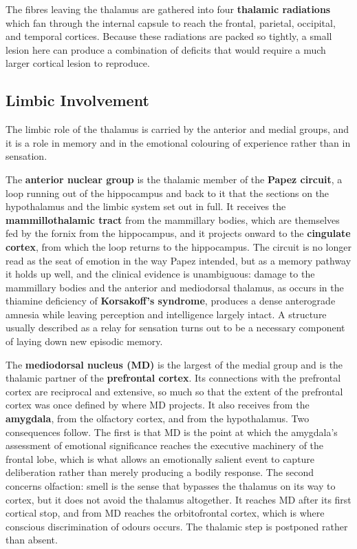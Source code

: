 \documentclass[11pt]{article}
\begin{document}
The fibres leaving the thalamus are gathered into four \textbf{thalamic radiations} which fan through the internal capsule to reach the frontal, parietal, occipital, and temporal cortices. Because these radiations are packed so tightly, a small lesion here can produce a combination of deficits that would require a much larger cortical lesion to reproduce.

\subsection{Limbic Involvement}

The limbic role of the thalamus is carried by the anterior and medial groups, and it is a role in memory and in the emotional colouring of experience rather than in sensation.

The \textbf{anterior nuclear group} is the thalamic member of the \textbf{Papez circuit}, a loop running out of the hippocampus and back to it that the sections on the hypothalamus and the limbic system set out in full. It receives the \textbf{mammillothalamic tract} from the mammillary bodies, which are themselves fed by the fornix from the hippocampus, and it projects onward to the \textbf{cingulate cortex}, from which the loop returns to the hippocampus. The circuit is no longer read as the seat of emotion in the way Papez intended, but as a memory pathway it holds up well, and the clinical evidence is unambiguous: damage to the mammillary bodies and the anterior and mediodorsal thalamus, as occurs in the thiamine deficiency of \textbf{Korsakoff's syndrome}, produces a dense anterograde amnesia while leaving perception and intelligence largely intact. A structure usually described as a relay for sensation turns out to be a necessary component of laying down new episodic memory.

The \textbf{mediodorsal nucleus (MD)} is the largest of the medial group and is the thalamic partner of the \textbf{prefrontal cortex}. Its connections with the prefrontal cortex are reciprocal and extensive, so much so that the extent of the prefrontal cortex was once defined by where MD projects. It also receives from the \textbf{amygdala}, from the olfactory cortex, and from the hypothalamus. Two consequences follow. The first is that MD is the point at which the amygdala's assessment of emotional significance reaches the executive machinery of the frontal lobe, which is what allows an emotionally salient event to capture deliberation rather than merely producing a bodily response. The second concerns olfaction: smell is the sense that bypasses the thalamus on its way to cortex, but it does not avoid the thalamus altogether. It reaches MD after its first cortical stop, and from MD reaches the orbitofrontal cortex, which is where conscious discrimination of odours occurs. The thalamic step is postponed rather than absent.
\end{document}
